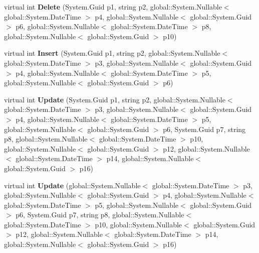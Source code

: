\begin{DoxyCompactItemize}
\item 
virtual int {\bfseries Delete} (System.\+Guid p1, string p2, global\+::\+System.\+Nullable$<$ global\+::\+System.\+Date\+Time $>$ p4, global\+::\+System.\+Nullable$<$ global\+::\+System.\+Guid $>$ p6, global\+::\+System.\+Nullable$<$ global\+::\+System.\+Date\+Time $>$ p8, global\+::\+System.\+Nullable$<$ global\+::\+System.\+Guid $>$ p10)\hypertarget{class_products_1_1_data_1_1ds_sage_table_adapters_1_1ta_tour_kunde_xref_a2b29c2514f1bb02eca21a7e01f2caec9}{}\label{class_products_1_1_data_1_1ds_sage_table_adapters_1_1ta_tour_kunde_xref_a2b29c2514f1bb02eca21a7e01f2caec9}

\item 
virtual int {\bfseries Insert} (System.\+Guid p1, string p2, global\+::\+System.\+Nullable$<$ global\+::\+System.\+Date\+Time $>$ p3, global\+::\+System.\+Nullable$<$ global\+::\+System.\+Guid $>$ p4, global\+::\+System.\+Nullable$<$ global\+::\+System.\+Date\+Time $>$ p5, global\+::\+System.\+Nullable$<$ global\+::\+System.\+Guid $>$ p6)\hypertarget{class_products_1_1_data_1_1ds_sage_table_adapters_1_1ta_tour_kunde_xref_a101fa567cb3c6d5953989d7708fde957}{}\label{class_products_1_1_data_1_1ds_sage_table_adapters_1_1ta_tour_kunde_xref_a101fa567cb3c6d5953989d7708fde957}

\item 
virtual int {\bfseries Update} (System.\+Guid p1, string p2, global\+::\+System.\+Nullable$<$ global\+::\+System.\+Date\+Time $>$ p3, global\+::\+System.\+Nullable$<$ global\+::\+System.\+Guid $>$ p4, global\+::\+System.\+Nullable$<$ global\+::\+System.\+Date\+Time $>$ p5, global\+::\+System.\+Nullable$<$ global\+::\+System.\+Guid $>$ p6, System.\+Guid p7, string p8, global\+::\+System.\+Nullable$<$ global\+::\+System.\+Date\+Time $>$ p10, global\+::\+System.\+Nullable$<$ global\+::\+System.\+Guid $>$ p12, global\+::\+System.\+Nullable$<$ global\+::\+System.\+Date\+Time $>$ p14, global\+::\+System.\+Nullable$<$ global\+::\+System.\+Guid $>$ p16)\hypertarget{class_products_1_1_data_1_1ds_sage_table_adapters_1_1ta_tour_kunde_xref_a665961be88602ce955e61dafc46f5cbb}{}\label{class_products_1_1_data_1_1ds_sage_table_adapters_1_1ta_tour_kunde_xref_a665961be88602ce955e61dafc46f5cbb}

\item 
virtual int {\bfseries Update} (global\+::\+System.\+Nullable$<$ global\+::\+System.\+Date\+Time $>$ p3, global\+::\+System.\+Nullable$<$ global\+::\+System.\+Guid $>$ p4, global\+::\+System.\+Nullable$<$ global\+::\+System.\+Date\+Time $>$ p5, global\+::\+System.\+Nullable$<$ global\+::\+System.\+Guid $>$ p6, System.\+Guid p7, string p8, global\+::\+System.\+Nullable$<$ global\+::\+System.\+Date\+Time $>$ p10, global\+::\+System.\+Nullable$<$ global\+::\+System.\+Guid $>$ p12, global\+::\+System.\+Nullable$<$ global\+::\+System.\+Date\+Time $>$ p14, global\+::\+System.\+Nullable$<$ global\+::\+System.\+Guid $>$ p16)\hypertarget{class_products_1_1_data_1_1ds_sage_table_adapters_1_1ta_tour_kunde_xref_af394036f9c10fead6861bed6466dd499}{}\label{class_products_1_1_data_1_1ds_sage_table_adapters_1_1ta_tour_kunde_xref_af394036f9c10fead6861bed6466dd499}

\end{DoxyCompactItemize}
